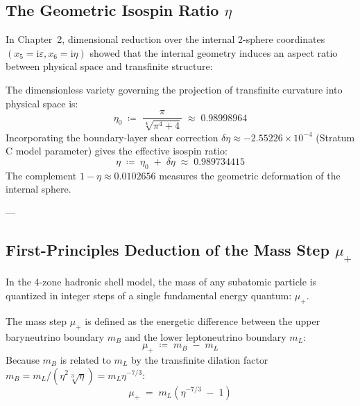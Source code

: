 \documentclass[
    12pt,
    a4paper,
    headings=normal,
    twoside=false,
    open=any,
    parskip=half
]{scrbook}
\newcommand{\iu}{\mathrm{i}}
\begin{document}
\subsection{The Geometric Isospin Ratio $\eta$}

In Chapter~2, dimensional reduction over the internal 2-sphere coordinates $(x_5 = \iu\varepsilon, x_6 = \iu\eta)$ showed that the internal geometry induces an aspect ratio between physical space and transfinite structure:

\begin{physdefinition}\label{def:ch5_geometric_isospin_ratio}
The dimensionless variety governing the projection of transfinite curvature into physical space is:
\begin{equation}
\eta_0 \;\coloneqq\; \frac{\pi}{\sqrt[4]{\pi^4 + 4}} \;\approx\; 0.98998964
\label{eq:ch5_eta0_def}
\end{equation}
Incorporating the boundary-layer shear correction $\delta\eta \approx -2.55226 \times 10^{-4}$ (Stratum C model parameter) gives the effective isospin ratio:
\begin{equation}
\boxed{\eta \;\coloneqq\; \eta_0 \;+\; \delta\eta \;\approx\; \mathbf{0.989734415}}
\label{eq:ch5_isospin_ratio_eta}
\end{equation}
The complement $1 - \eta \approx 0.0102656$ measures the geometric deformation of the internal sphere.
\end{physdefinition}

---

\subsection{First-Principles Deduction of the Mass Step $\mu_+$}

In the 4-zone hadronic shell model, the mass of any subatomic particle is quantized in integer steps of a single fundamental energy quantum: $\mu_+$.

The mass step $\mu_+$ is defined as the energetic difference between the upper baryneutrino boundary $m_B$ and the lower leptoneutrino boundary $m_L$:
\begin{equation}
\mu_+ \;\coloneqq\; m_B \;-\; m_L
\end{equation}
Because $m_B$ is related to $m_L$ by the transfinite dilation factor $m_B = m_L / (\eta^2 \sqrt[3]{\eta}) = m_L \eta^{-7/3}$:
\begin{equation}
\mu_+ \;=\; m_L \left( \eta^{-7/3} \;-\; 1 \right)
\label{eq:ch5_mu_plus_ratio_formula}
\end{equation}
\end{document}
